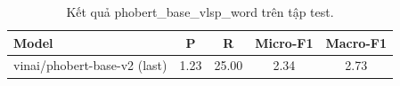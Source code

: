 \begin{table}[t]
\centering
\begin{tabular}{lcccc}
\hline
\textbf{Model} & \textbf{P} & \textbf{R} & \textbf{Micro-F1} & \textbf{Macro-F1} \\
\hline
vinai/phobert-base-v2 (last) & 1.23 & 25.00 & 2.34 & 2.73 \\
\hline
\end{tabular}
\caption{Kết quả phobert_base_vlsp_word trên tập test.}
\label{tab:main}
\end{table}